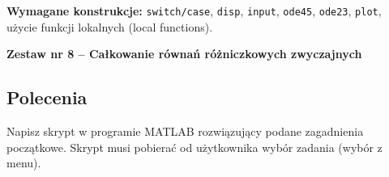 \documentclass[a4paper,11pt]{article}
\begin{document}
\vspace{0.3cm}
\begin{ramka}
\textbf{Wymagane konstrukcje:}
\texttt{switch/case}, \texttt{disp}, \texttt{input}, \texttt{ode45}, \texttt{ode23}, \texttt{plot}, użycie funkcji lokalnych (local functions).
\end{ramka}

\clearpage
\begin{center}
  {\large\bfseries Zestaw nr 8 \quad -- \quad Całkowanie równań różniczkowych zwyczajnych}
\end{center}
\hrulefill
\vspace{0.4cm}

\subsection*{Polecenia}

Napisz skrypt w programie MATLAB rozwiązujący podane zagadnienia początkowe. Skrypt musi pobierać od użytkownika wybór zadania (wybór z menu).
\end{document}
